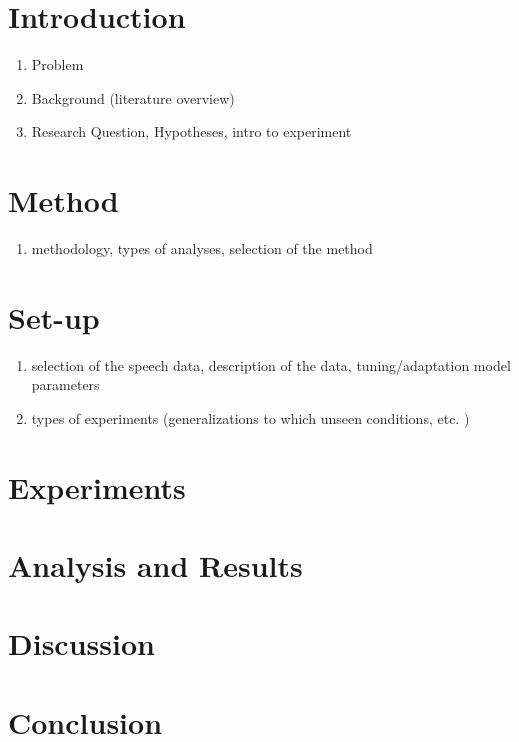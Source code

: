 \documentclass{article}
\theoremstyle{definition}
\theoremstyle{remark}
\begin{document}
\tableofcontents

\newpage

\section{Introduction}

\begin{enumerate}
	\item Problem
	\item Background (literature overview)
	\item Research Question, Hypotheses, intro to experiment
\end{enumerate}

\section{Method}

\begin{enumerate}
	\item methodology, types of analyses, selection of the method
\end{enumerate}

\section{Set-up}

\begin{enumerate}
	\item selection of the speech data, description of the data, tuning/adaptation model parameters
	\item types of experiments (generalizations to which unseen conditions, etc. )
\end{enumerate}


\section{Experiments}



\section{Analysis and Results}


\section{Discussion}

\section{Conclusion}
\end{document}
